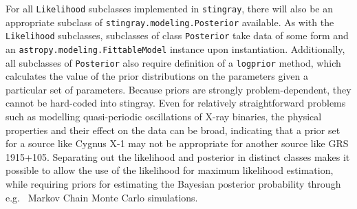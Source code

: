 \documentclass[12pt]{emulateapj}
\newcommand{\stingray}{\texttt{stingray}\xspace}
\newcommand{\likelihood}{\texttt{Likelihood}\xspace}
\begin{document}
For all \likelihood subclasses implemented in \stingray, there will also be an appropriate subclass of \verb|stingray.modeling.Posterior| available. As with the \likelihood subclasses, subclasses of class \verb|Posterior| take data of some form and an \verb|astropy.modeling.FittableModel| instance upon instantiation. Additionally, all subclasses of  \verb|Posterior| also require definition of a \texttt{logprior} method, which calculates the value of the prior distributions on the parameters given a particular set of parameters. Because priors are strongly problem-dependent, they cannot be hard-coded into stingray. Even for relatively straightforward problems such as modelling quasi-periodic oscillations of X-ray binaries, the physical properties and their effect on the data can be broad, indicating that a prior set for a source like Cygnus X-1 may not be appropriate for another source like GRS 1915+105. Separating out the likelihood and posterior in distinct classes makes it possible to allow the use of the likelihood for maximum likelihood estimation, while requiring priors for estimating the Bayesian posterior probability through e.g.~ Markov Chain Monte Carlo simulations.

\end{document}
